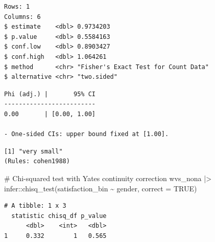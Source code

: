 \documentclass[
  letterpaper,
  DIV=11,
  numbers=noendperiod]{scrreprt}
\newenvironment{Shaded}{\begin{snugshade}}{\end{snugshade}}
\newcommand{\AttributeTok}[1]{\textcolor[rgb]{0.40,0.45,0.13}{#1}}
\newcommand{\CommentTok}[1]{\textcolor[rgb]{0.37,0.37,0.37}{#1}}
\newcommand{\ConstantTok}[1]{\textcolor[rgb]{0.56,0.35,0.01}{#1}}
\newcommand{\DocumentationTok}[1]{\textcolor[rgb]{0.37,0.37,0.37}{\textit{#1}}}
\newcommand{\FunctionTok}[1]{\textcolor[rgb]{0.28,0.35,0.67}{#1}}
\newcommand{\NormalTok}[1]{\textcolor[rgb]{0.00,0.23,0.31}{#1}}
\newcommand{\OtherTok}[1]{\textcolor[rgb]{0.00,0.23,0.31}{#1}}
\newcommand{\SpecialCharTok}[1]{\textcolor[rgb]{0.37,0.37,0.37}{#1}}
\newcommand{\StringTok}[1]{\textcolor[rgb]{0.13,0.47,0.30}{#1}}
\begin{document}
\begin{verbatim}
Rows: 1
Columns: 6
$ estimate    <dbl> 0.9734203
$ p.value     <dbl> 0.5584163
$ conf.low    <dbl> 0.8903427
$ conf.high   <dbl> 1.064261
$ method      <chr> "Fisher's Exact Test for Count Data"
$ alternative <chr> "two.sided"
\end{verbatim}

\begin{Shaded}
\end{Shaded}

\begin{verbatim}
Phi (adj.) |       95% CI
-------------------------
0.00       | [0.00, 1.00]

- One-sided CIs: upper bound fixed at [1.00].
\end{verbatim}

\begin{Shaded}
\end{Shaded}

\begin{verbatim}
[1] "very small"
(Rules: cohen1988)
\end{verbatim}

\begin{Shaded}
\begin{Highlighting}[]
\CommentTok{\# Chi{-}squared test with Yate\textquotesingle{}s continuity correction}
\NormalTok{wvs\_nona }\SpecialCharTok{|\textgreater{}}\NormalTok{ infer}\SpecialCharTok{::}\FunctionTok{chisq\_test}\NormalTok{(satisfaction\_bin }\SpecialCharTok{\textasciitilde{}}\NormalTok{ gender,}
                               \AttributeTok{correct =} \ConstantTok{TRUE}\NormalTok{)}
\end{Highlighting}
\end{Shaded}

\begin{verbatim}
# A tibble: 1 x 3
  statistic chisq_df p_value
      <dbl>    <int>   <dbl>
1     0.332        1   0.565
\end{verbatim}
\end{document}
